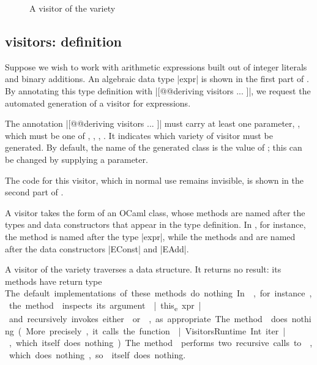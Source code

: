 \documentclass[11pt,a4paper,twoside]{article}
\begin{document}

\begin{figure}[t]
\vspace{-\baselineskip}
\caption{A visitor of the \iter variety}
\label{fig:expr00}
\end{figure}

\subsection{\iter visitors: definition}
\label{sec:intro:iter:def}

Suppose we wish to work with arithmetic expressions built out of integer
literals and binary additions. An algebraic data type \oc|expr| is shown in
the first part of . By annotating this type definition with
\oc|[@@deriving visitors { ... }]|, we request the automated generation of a
visitor for expressions.

The annotation \oc|[@@deriving visitors { ... }]| must carry at least one
parameter, \variety, which must be one of \iter, \map, \itertwo, \maptwo. It
indicates which variety of visitor must be generated. By default, the name of
the generated class is the value of \variety; this can be changed by supplying
a \name parameter.

The code for this visitor, which in normal use remains invisible, is shown in
the second part of .

A visitor takes the form of an OCaml class, whose methods are named after the
types and data constructors that appear in the type definition. In
, for instance, the method  is named after
the type \oc|expr|, while the methods  and
 are named after the data constructors \oc|EConst| and
\oc|EAdd|.

A visitor of the \iter variety traverses a data structure. It returns no
result: its methods have return type \unit. The default implementations of
these methods do nothing. In , for instance, the method
 inspects its argument \oc|this_expr| and recursively
invokes either  or , as
appropriate. The method  does nothing. (More precisely,
it calls the function \oc|VisitorsRuntime.Int.iter|, which itself does
nothing.) The method  performs two recursive calls to
, which does nothing, so  itself does
nothing.
\end{document}
